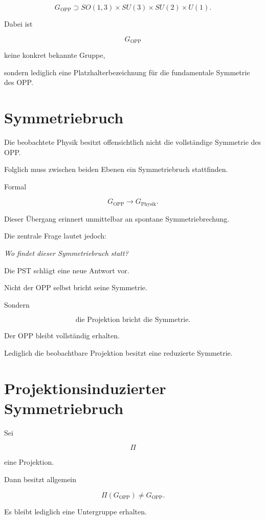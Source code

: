 \[
G_{\mathrm{OPP}}
\supset
SO(1,3)
\times
SU(3)
\times
SU(2)
\times
U(1).
\]

Dabei ist

\[
G_{\mathrm{OPP}}
\]

keine konkret bekannte Gruppe,

sondern lediglich eine Platzhalterbezeichnung für die fundamentale Symmetrie des OPP.

\section*{Symmetriebruch}

Die beobachtete Physik besitzt offensichtlich nicht die vollständige Symmetrie des OPP.

Folglich muss zwischen beiden Ebenen ein Symmetriebruch stattfinden.

Formal

\[
G_{\mathrm{OPP}}
\longrightarrow
G_{\mathrm{Physik}}.
\]

Dieser Übergang erinnert unmittelbar an spontane Symmetriebrechung.

Die zentrale Frage lautet jedoch:

\begin{center}

\emph{Wo findet dieser Symmetriebruch statt?}

\end{center}

Die PST schlägt eine neue Antwort vor.

Nicht der OPP selbst bricht seine Symmetrie.

Sondern

\[
\boxed{
\text{die Projektion bricht die Symmetrie.}
}
\]

Der OPP bleibt vollständig erhalten.

Lediglich die beobachtbare Projektion besitzt eine reduzierte Symmetrie.

\section*{Projektionsinduzierter Symmetriebruch}

Sei

\[
\Pi
\]

eine Projektion.

Dann besitzt allgemein

\[
\Pi(G_{\mathrm{OPP}})
\neq
G_{\mathrm{OPP}}.
\]

Es bleibt lediglich eine Untergruppe erhalten.

